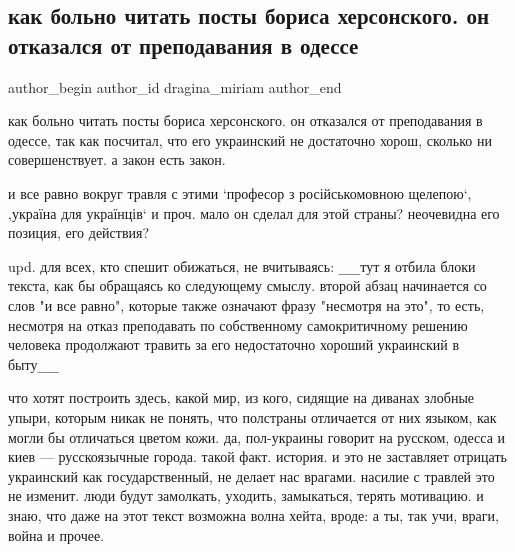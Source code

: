  
 
 
 
 
 
\subsection{как больно читать посты бориса херсонского. он отказался от преподавания в одессе}
\label{sec:20_07_2021.fb.dragina_miriam.1.mova_jazyk_boris_hersonskij_odessa}
 
\ifcmt
 author_begin
   author_id dragina_miriam
 author_end
\fi

как больно читать посты бориса херсонского. он отказался от преподавания в
одессе, так как посчитал, что его украинский не достаточно хорош, сколько ни
совершенствует. а закон есть закон. 

и все равно вокруг травля с этими ‘професор з російськомовною щелепою‘,
‚україна для українців‘ и проч.  мало он сделал для этой страны? неочевидна его
позиция, его действия? 

upd. для всех, кто спешит обижаться, не вчитываясь: \verb|___|тут я отбила блоки
текста, как бы обращаясь ко следующему смыслу. второй абзац начинается со слов
"и все равно", которые также означают фразу "несмотря на это", то есть,
несмотря на отказ преподавать по собственному самокритичному решению человека
продолжают травить за его недостаточно хороший украинский в быту\verb|___|

что хотят построить здесь, какой мир, из кого, сидящие на диванах злобные
упыри, которым никак не понять, что полстраны отличается от них языком, как
могли бы отличаться цветом кожи. да, пол-украины говорит на русском, одесса и
киев — русскоязычные города. такой факт. история. и это не заставляет отрицать
украинский как государственный, не делает нас врагами. насилие с травлей это не
изменит. люди будут замолкать, уходить, замыкаться, терять мотивацию. и знаю,
что даже на этот текст возможна волна хейта, вроде: а ты, так учи, враги, война
и прочее. 

